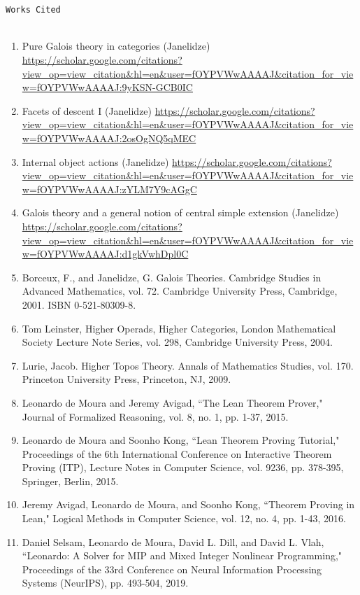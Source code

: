 \documentclass{book}
\theoremstyle{definition}
\begin{document}
{{\newpage
{
\Huge 
\begin{center}
\ \\
\ \\
\texttt{Works Cited}
\ \\
\ \\
\end{center}
\thispagestyle{empty}
}

\begin{enumerate}
\item Pure Galois theory in categories (Janelidze) \url{https://scholar.google.com/citations?view_op=view_citation&hl=en&user=fOYPVWwAAAAJ&citation_for_view=fOYPVWwAAAAJ:9yKSN-GCB0IC}
\item Facets of descent I (Janelidze) \url{https://scholar.google.com/citations?view_op=view_citation&hl=en&user=fOYPVWwAAAAJ&citation_for_view=fOYPVWwAAAAJ:2osOgNQ5qMEC}
\item Internal object actions (Janelidze) \url{https://scholar.google.com/citations?view_op=view_citation&hl=en&user=fOYPVWwAAAAJ&citation_for_view=fOYPVWwAAAAJ:zYLM7Y9cAGgC}
\item Galois theory and a general notion of central simple extension (Janelidze) \url{https://scholar.google.com/citations?view_op=view_citation&hl=en&user=fOYPVWwAAAAJ&citation_for_view=fOYPVWwAAAAJ:d1gkVwhDpl0C}
\item Borceux, F., and Janelidze, G. Galois Theories. Cambridge Studies in Advanced Mathematics, vol. 72. Cambridge University Press, Cambridge, 2001. ISBN 0-521-80309-8.
\item Tom Leinster, Higher Operads, Higher Categories, London Mathematical Society Lecture Note Series, vol. 298, Cambridge University Press, 2004.
\item Lurie, Jacob. Higher Topos Theory. Annals of Mathematics Studies, vol. 170. Princeton University Press, Princeton, NJ, 2009.
\item Leonardo de Moura and Jeremy Avigad, ``The Lean Theorem Prover," Journal of Formalized Reasoning, vol. 8, no. 1, pp. 1-37, 2015.
\item Leonardo de Moura and Soonho Kong, ``Lean Theorem Proving Tutorial," Proceedings of the 6th International Conference on Interactive Theorem Proving (ITP), Lecture Notes in Computer Science, vol. 9236, pp. 378-395, Springer, Berlin, 2015.
\item Jeremy Avigad, Leonardo de Moura, and Soonho Kong, ``Theorem Proving in Lean," Logical Methods in Computer Science, vol. 12, no. 4, pp. 1-43, 2016.
\item Daniel Selsam, Leonardo de Moura, David L. Dill, and David L. Vlah, ``Leonardo: A Solver for MIP and Mixed Integer Nonlinear Programming," Proceedings of the 33rd Conference on Neural Information Processing Systems (NeurIPS), pp. 493-504, 2019.

\end{enumerate}}}
\end{document}

